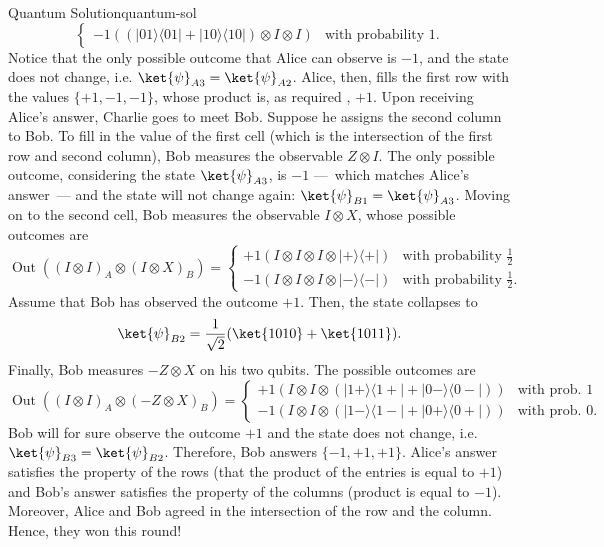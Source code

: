 \documentclass{llncs}
\newcommand{\ketbra}[2]{\ensuremath{| #1 \rangle \langle #2 |}}
\begin{document}
\begin{tcbexample}{Quantum Solution}{quantum-sol}
\begin{equation}
\begin{cases}
      -1 \left(\left(\ketbra{01}{01} + \ketbra{10}{10}\right) \otimes I \otimes I\right)
      &\text{with probability } 1.
    \end{cases}
  \end{equation}
  Notice that the only possible outcome that Alice can observe is
  \(-1\), and the state does not change, i.e.
  \(\ket{\psi}_{A3} = \ket{\psi}_{A2}\).  Alice, then, fills the first
  row with the values \(\{+1, -1, -1\}\), whose product is, as
  required
  , \(+1\). Upon receiving Alice's answer, Charlie goes to
  meet Bob. Suppose he assigns the second column to Bob. To fill in
  the value of the first cell (which is the intersection of the first
  row and second column), Bob measures the observable \(Z \otimes
  I\). The only possible outcome, considering the state
  \(\ket{\psi}_{A3}\), is \(-1\) ---~which matches Alice's answer~---
  and the state will not change again:
  \(\ket{\psi}_{B1} = \ket{\psi}_{A3}\). Moving on to the second cell,
  Bob measures the observable \(I \otimes X\), whose possible outcomes
  are
  \begin{equation}
    \operatorname{Out}((I \otimes I)_{A} \otimes (I \otimes X)_{B}) =
    \begin{cases}
      +1 \left(I \otimes I \otimes I \otimes \ketbra{+}{+}\right)
      &\text{with probability } \frac{1}{2} \\
      -1 \left(I \otimes I \otimes I \otimes \ketbra{-}{-}\right)
      &\text{with probability } \frac{1}{2}.
    \end{cases}
  \end{equation}
  Assume that Bob has observed the outcome \(+1\). Then, the state
  collapses to
  \begin{equation}
    \ket{\psi}_{B2} =  \frac{1}{\sqrt{2}}(\ket{1010} + \ket{1011}).
  \end{equation}
  Finally, Bob measures \(-Z \otimes X\) on his two qubits.
  The possible outcomes are
  \begin{equation}
    \operatorname{Out}((I \otimes I)_{A} \otimes (-Z \otimes X)_{B}) =
    \begin{cases}
      +1 \left(I \otimes I \otimes \left(\ketbra{1+}{1\!+\!} + \ketbra{0-}{0\!-\!}\right)\right)
      &\text{with prob. } 1 \\
      -1 \left(I \otimes I \otimes \left(\ketbra{1-}{1\!-\!} + \ketbra{0+}{0\!+\!}\right)\right)
      &\text{with prob. } 0.
    \end{cases}
  \end{equation}
  Bob will for sure observe the outcome \(+1\) and the state does not
 change, i.e.  \(\ket{\psi}_{B3} = \ket{\psi}_{B2}\). Therefore, Bob
  answers \(\{-1, +1, +1\}\). Alice's answer satisfies the property of
  the rows (that the product of the entries is equal to \(+1\)) and
  Bob's answer satisfies the property of the columns (product is equal
  to \(-1\)).  Moreover, Alice and Bob agreed in the intersection of
  the row and the column.  Hence, they won this round!
\end{tcbexample}
\end{document}

